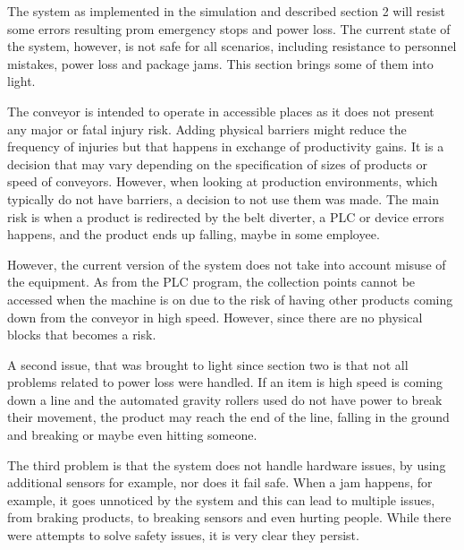 The system as implemented in the simulation and described section 2 will resist some errors resulting prom emergency stops and power loss. The current state of the system, however, is not safe for all scenarios, including resistance to personnel mistakes, power loss and package jams. This section brings some of them into light.

The conveyor is intended to operate in accessible places as it does not present any major or fatal injury risk. Adding physical barriers might reduce the frequency of injuries but that happens in exchange of productivity gains. It is a decision that may vary depending on the specification of sizes of products or speed of conveyors. However, when looking at production environments, which typically do not have barriers, a decision to not use them was made. The main risk is when a product is redirected by the belt diverter, a PLC or device errors happens, and the product ends up falling, maybe in some employee.

However, the current version of the system does not take into account misuse of the equipment. As from the PLC program, the collection points cannot be accessed when the machine is on due to the risk of having other products coming down from the conveyor in high speed. However, since there are no physical blocks that becomes a risk.

A second issue, that was brought to light since section two is that not all problems related to power loss were handled. If an item is high speed is coming down a line and the automated gravity rollers used do not have power to break their movement, the product may reach the end of the line, falling in the ground and breaking or maybe even hitting someone.

The third problem is that the system does not handle hardware issues, by using additional sensors for example, nor does it fail safe. When a jam happens, for example, it goes unnoticed by the system and this can lead to multiple issues, from braking products, to breaking sensors and even hurting people. While there were attempts to solve safety issues, it is very clear they persist. 